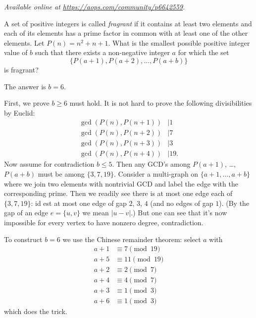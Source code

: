 \textsl{Available online at \url{https://aops.com/community/p6642559}.}
\begin{mdframed}[style=mdpurplebox,frametitle={Problem statement}]
A set of positive integers is called \emph{fragrant}
if it contains at least two elements and each of its elements
has a prime factor in common with at least one of the other elements.
Let $P(n)=n^2+n+1$.
What is the smallest possible positive integer value of $b$ such that
there exists a non-negative integer $a$ for which the set
\[ \{P(a+1),P(a+2),\dots,P(a+b)\} \]
is fragrant?
\end{mdframed}
The answer is $b = 6$.

First, we prove $b \ge 6$ must hold.
It is not hard to prove the following divisibilities by Euclid:
\begin{align*}
 \gcd(P(n), P(n+1)) &\mid 1 \\
 \gcd(P(n), P(n+2)) &\mid 7 \\
 \gcd(P(n), P(n+3)) &\mid 3 \\
 \gcd(P(n), P(n+4)) &\mid 19.
\end{align*}
Now assume for contradiction $b \le 5$.
Then any GCD's among $P(a+1)$, \dots, $P(a+b)$ must be among $\{3, 7, 19\}$.
Consider a multi-graph on $\{a+1, \dots, a+b\}$ where we join two elements with nontrivial GCD
and label the edge with the corresponding prime.
Then we readily see there is at most one edge each of $\{3, 7, 19\}$:
id est at most one edge of gap $2$, $3$, $4$ (and no edges of gap $1$).
(By the gap of an edge $e = \{u,v\}$ we mean $|u - v|$.)
But one can see that it's now impossible for every vertex to have nonzero degree, contradiction.

To construct $b = 6$ we use the Chinese remainder theorem: select $a$ with
\begin{align*}
 a+1 & \equiv 7 \pmod{19} \\
 a+5 & \equiv 11 \pmod{19} \\
 a+2 & \equiv 2 \pmod{7} \\
 a+4 & \equiv 4 \pmod{7} \\
 a+3 & \equiv 1 \pmod{3} \\
 a+6 & \equiv 1 \pmod{3}
\end{align*}
which does the trick.
\pagebreak